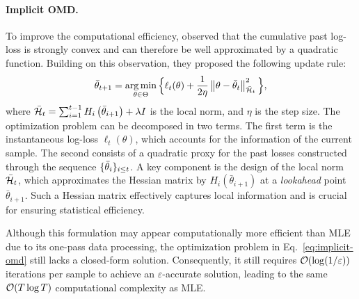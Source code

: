 \paragraph{Implicit OMD.} To improve the computational efficiency, \citet{AISTATS'22:Faury-Jointly} observed that the cumulative past log-loss is strongly convex and can therefore be well approximated by a quadratic function. Building on this observation, they proposed the following update rule:
\begin{align}
  \label{eq:implicit-omd}
  \bar{\theta}_{t+1}=\operatorname*{arg\,min}_{\theta \in \Theta} \Big\{\ell_t(\theta)+\frac{1}{2 \eta}\left\|\theta-\bar{\theta}_t\right\|_{\bar{\mathcal{H}}_t}^2\Big\},
\end{align}
where $\bar{\mathcal{H}}_t=\sum_{i=1}^{t-1} H_i\left(\bar{\theta}_{i+1}\right)+\lambda I$ is the local norm, and $\eta$ is the step size. The optimization problem can be decomposed in two terms. The first term is the instantaneous log-loss $\ell_{t}(\theta)$, which accounts for the information of the current sample. The second consists of a quadratic proxy for the past losses constructed through the sequence $\{\bar{\theta}_{i}\}_{i\leq t}$. A key component is the design of the local norm $\bar{\mathcal{H}}_t$, which approximates the Hessian matrix by $H_i\left(\bar{\theta}_{i+1}\right)$ at a \emph{lookahead} point $\bar{\theta}_{i+1}$. Such a Hessian matrix effectively captures local information and is crucial for ensuring statistical efficiency.

Although this formulation may appear computationally more efficient than MLE due to its one-pass data processing, the optimization problem in Eq.~\eqref{eq:implicit-omd} still lacks a closed-form solution. Consequently, it still requires $\mathcal{O}(\log(1/\varepsilon))$ iterations per sample to achieve an $\varepsilon$-accurate solution, leading to the same $\mathcal{O}(T \log T)$ computational complexity as MLE.

